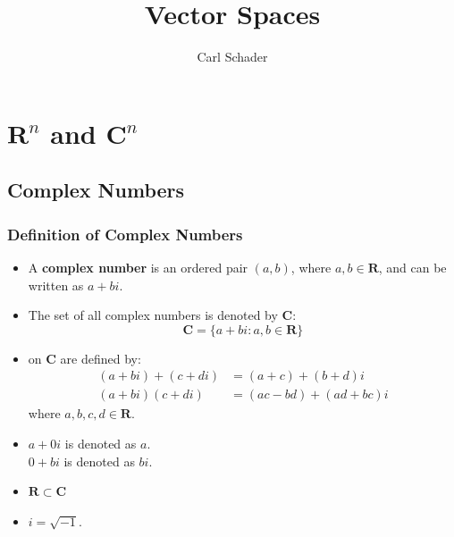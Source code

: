 \documentclass{article}
\title{Vector Spaces}
\author{Carl Schader}
\date{}
\begin{document}
	\maketitle
	\tableofcontents
	\newpage

	\section{$\mathbf{R}^n$ and $\mathbf{C}^n$}
	\subsection{Complex Numbers}
	\subsubsection{Definition of Complex Numbers}
	\begin{itemize}
		\item A \textbf{complex number} is an ordered pair $(a, b)$, where $a, b \in \mathbf{R}$, and can be written as $a + bi$.
		\item The set of all complex numbers is denoted by $\mathbf{C}$:
		\begin{equation*}
			\mathbf{C} = \{ a + bi : a, b \in \mathbf{R} \}
		\end{equation*}
		\item {} on $\mathbf{C}$ are defined by:
		\begin{align*}
			(a + bi) + (c + di) &= (a + c) + (b + d)i\\
			(a + bi)(c + di) &= (ac - bd) + (ad + bc)i
		\end{align*}
		where $a,b,c,d \in \mathbf{R}$.
		\item $a + 0i$ is denoted as $a$.\\
			$0 + bi$ is denoted as $bi$.\\
		\item $\mathbf{R} \subset \mathbf{C}$
		\item $i = \sqrt{-1}$.
	\end{itemize}
	
\end{document}
